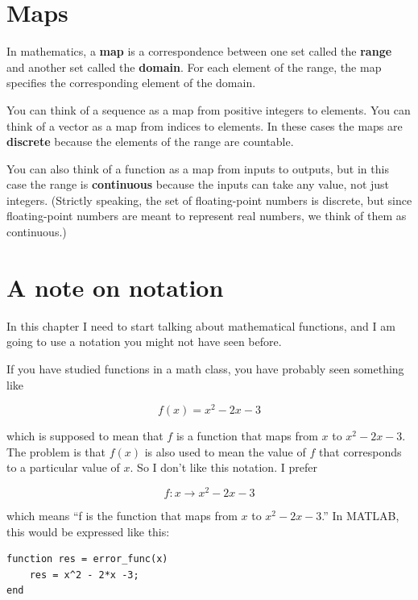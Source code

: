\documentclass[
]{book}
\begin{document}
\section{Maps}
\label{sect:map}

In mathematics, a {\bf map} is a correspondence between one
set called the {\bf range} and another set called the
{\bf domain}.  For each element of the range, the map specifies
the corresponding element of the domain.

You can think of a sequence as a map from positive integers
to elements.  You can think of a vector
as a map from indices to elements.  In these cases the maps
are {\bf discrete} because the elements of the range are countable.

You can also think of a function as a map from inputs to outputs, but
in this case the range is {\bf continuous} because the inputs can take
any value, not just integers.  (Strictly speaking, the set of
floating-point numbers is discrete, but since floating-point numbers
are meant to represent real numbers, we think of them as continuous.)


\section{A note on notation}
\label{sect:notation}

In this chapter I need to start talking about mathematical
functions, and I am going to use a notation you might not have
seen before.

If you have studied functions in a math class, you have probably
seen something like

\begin{equation}
f(x) = x^2 - 2x -3
\end{equation}

which is supposed to mean that $f$ is a function that maps from
$x$ to $x^2 - 2x -3$.  The problem is that $f(x)$ is also used to mean
the value of $f$ that corresponds to a particular value of $x$.  So I
don't like this notation.  I prefer

\begin{equation}
f : x \to x^2 - 2x -3
\end{equation}

which means ``f is the function that maps from
$x$ to $x^2 - 2x -3$.''  In MATLAB, this would be expressed
like this:

\begin{verbatim}
function res = error_func(x)
    res = x^2 - 2*x -3;
end
\end{verbatim}
\end{document}
